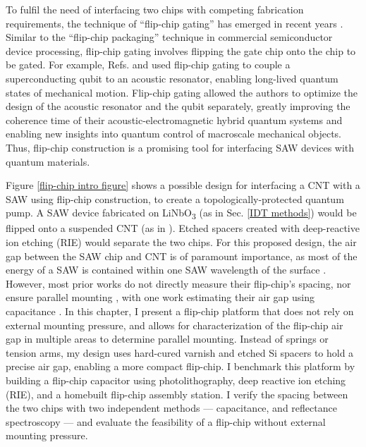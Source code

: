 \documentclass[double,12pt,1in,seploa]{beavtex}
\begin{document}
To fulfil the need of interfacing two chips with competing fabrication requirements, the technique of “flip-chip gating” has emerged in recent years \cite{beukman_noninvasive_2015, chu_creation_2018, satzinger_quantum_2018, robertson_non-invasive_2020}. Similar to the “flip-chip packaging” technique in commercial semiconductor device processing, flip-chip gating involves flipping the gate chip onto the chip to be gated. For example, Refs. \cite{chu_creation_2018} and \cite{satzinger_quantum_2018} used flip-chip gating to couple a superconducting qubit to an acoustic resonator, enabling long-lived quantum states of mechanical motion. Flip-chip gating allowed the authors to optimize the design of the acoustic resonator and the qubit separately, greatly improving the coherence time of their acoustic-electromagnetic hybrid quantum systems and enabling new insights into quantum control of macroscale mechanical objects. Thus, flip-chip construction is a promising tool for interfacing SAW devices with quantum materials.

Figure \ref{flip-chip intro figure} shows a possible design for interfacing a CNT with a SAW using flip-chip construction, to create a topologically-protected quantum pump. A SAW device fabricated on LiNbO\textsubscript{3} (as in Sec. \ref{IDT methods}) would be flipped onto a suspended CNT (as in \cite{senger_universal_2018}). Etched spacers created with deep-reactive ion etching (RIE) would separate the two chips. For this proposed design, the air gap between the SAW chip and CNT is of paramount importance, as most of the energy of a SAW is contained within one SAW wavelength of the surface \cite{wixforth_surface_1989}. However, most prior works do not directly measure their flip-chip’s spacing, nor ensure parallel mounting \cite{chu_creation_2018,satzinger_quantum_2018, bennaceur_mechanical_2015}, with one work estimating their air gap using capacitance \cite{beukman_noninvasive_2015}. In this chapter, I present a flip-chip platform that does not rely on external mounting pressure, and allows for characterization of the flip-chip air gap in multiple areas to determine parallel mounting. Instead of springs or tension arms, my design uses hard-cured varnish and etched Si spacers to hold a precise air gap, enabling a more compact flip-chip. I benchmark this platform by building a flip-chip capacitor using photolithography, deep reactive ion etching (RIE), and a homebuilt flip-chip assembly station. I verify the spacing between the two chips with two independent methods — capacitance, and reflectance spectroscopy — and evaluate the feasibility of a flip-chip without external mounting pressure.
\end{document}
